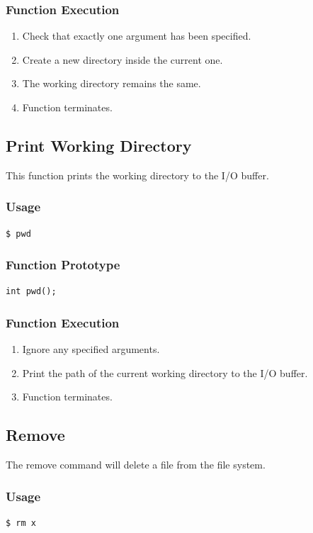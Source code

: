 \documentclass[12pt,letterpaper]{article}
\begin{document}
\subsubsection{Function Execution}
\begin{enumerate}
\item Check that exactly one argument has been specified.
\item Create a new directory inside the current one.
\item The working directory remains the same.
\item Function terminates.
\end{enumerate}

\subsection{Print Working Directory}
This function prints the working directory to the I/O buffer.
\subsubsection{Usage}
\begin{verbatim}
$ pwd
\end{verbatim}
\subsubsection{Function Prototype}
\begin{verbatim}
int pwd();
\end{verbatim}
\subsubsection{Function Execution}
\begin{enumerate}
\item Ignore any specified arguments.
\item Print the path of the current working directory to the I/O buffer.
\item Function terminates.
\end{enumerate}

\subsection{Remove}
The remove command will delete a file from the file system.
\subsubsection{Usage}
\begin{verbatim}
$ rm x
\end{verbatim}
\end{document}
